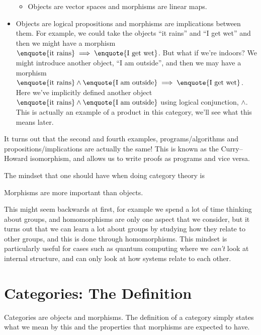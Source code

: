 \documentclass[fleqn]{NotesClass}
\begin{document}
\begin{itemize}
\begin{itemize}
            \item Objects are vector spaces and morphisms are linear maps.
        \end{itemize}
        \item Objects are logical propositions and morphisms are implications between them.
        For example, we could take the objects \enquote{it rains} and \enquote{I get wet} and then we might have a morphism \(\text{\enquote{it rains}} \implies \text{\enquote{I get wet}}\).
        But what if we're indoors?
        We might introduce another object, \enquote{I am outside}, and then we may have a morphism \(\text{\enquote{it rains}} \land \text{\enquote{I am outside}} \implies \text{\enquote{I get wet}}\).
        Here we've implicitly defined another object \(\text{\enquote{it rains}} \land \text{\enquote{I am outside}}\) using logical conjunction, \(\land\).
        This is actually an example of a product in this category, we'll see what this means later.
    \end{itemize}
    
    It turns out that the second and fourth examples, programs/algorithms and propositions/implications are actually the same!
    This is known as the Curry--Howard isomorphism, and allows us to write proofs as programs and vice versa.
    
    The mindset that one should have when doing category theory is
    \begin{important}
        Morphisms are more important than objects.
    \end{important}
    \noindent This might seem backwards at first, for example we spend a lot of time thinking about groups, and homomorphisms are only one aspect that we consider, but it turns out that we can learn a lot about groups by studying how they relate to other groups, and this is done through homomorphisms.
    This mindset is particularly useful for cases such as quantum computing where we \emph{can't} look at internal structure, and can only look at how systems relate to each other.
    
    \section{Categories: The Definition}
    Categories are objects and morphisms.
    The definition of a category simply states what we mean by this and the properties that morphisms are expected to have.
    
\end{document}
